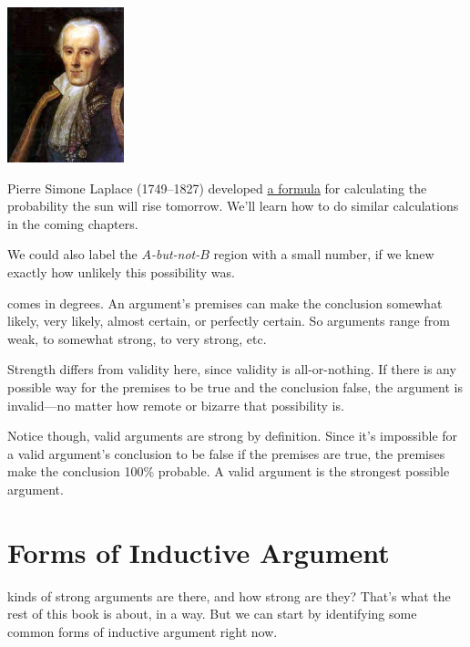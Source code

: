 \documentclass[justified]{tufte-book}
\theoremstyle{definition}
\theoremstyle{definition}
\theoremstyle{definition}
\theoremstyle{remark}
\begin{document}
\begin{marginfigure}
\includegraphics[width=1.33in]{img/laplace} \caption[Pierre Simone Laplace (1749--1827) developed
\href{https://bit.ly/2mU9WgW}{a formula} for calculating the probability
the sun will rise tomorrow. We'll learn how to do similar calculations
in the coming chapters.]{Pierre Simone Laplace (1749--1827) developed
\href{https://bit.ly/2mU9WgW}{a formula} for calculating the probability
the sun will rise tomorrow. We'll learn how to do similar calculations
in the coming chapters.}\label{fig:laplace}
\end{marginfigure}

We could also label the \emph{\(A\)-but-not-\(B\)} region with a small
number, if we knew exactly how unlikely this possibility was.

 comes in degrees. An argument's premises can make
the conclusion somewhat likely, very likely, almost certain, or
perfectly certain. So arguments range from weak, to somewhat strong, to
very strong, etc.

Strength differs from validity here, since validity is all-or-nothing.
If there is any possible way for the premises to be true and the
conclusion false, the argument is invalid---no matter how remote or
bizarre that possibility is.

Notice though, valid arguments are strong by definition. Since it's
impossible for a valid argument's conclusion to be false if the premises
are true, the premises make the conclusion 100\% probable. A valid
argument is the strongest possible argument.

\hypertarget{indargs}{%
\section{Forms of Inductive Argument}\label{indargs}}

 kinds of strong arguments are there, and how strong
are they? That's what the rest of this book is about, in a way. But we
can start by identifying some common forms of inductive argument right
now.
\end{document}

